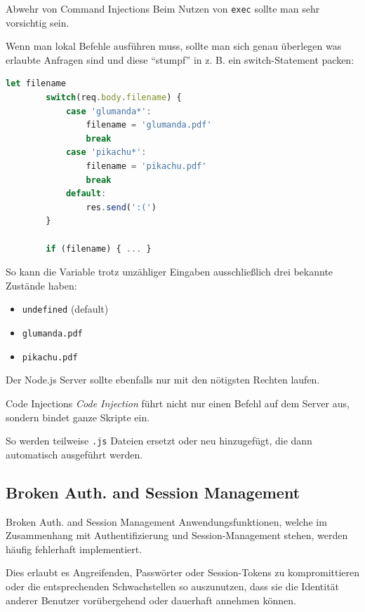 \begin{bonus}{Abwehr von Command Injections}
    Beim Nutzen von \texttt{exec} sollte man sehr vorsichtig sein.

    Wenn man lokal Befehle ausführen muss, sollte man sich genau überlegen was erlaubte Anfragen sind und diese \enquote{stumpf} in z. B. ein switch-Statement packen:
    \begin{lstlisting}[language=JavaScript]
        let filename
        switch(req.body.filename) {
            case 'glumanda*':
                filename = 'glumanda.pdf'
                break
            case 'pikachu*':
                filename = 'pikachu.pdf'
                break
            default:
                res.send(':(')
        }

        if (filename) { ... }
    \end{lstlisting}

    So kann die Variable trotz unzähliger Eingaben ausschließlich drei bekannte Zustände haben:
    \begin{itemize}
        \item \texttt{undefined} (default)
        \item \texttt{glumanda.pdf}
        \item \texttt{pikachu.pdf}
    \end{itemize}

    Der Node.js Server sollte ebenfalls nur mit den nötigsten Rechten laufen.
\end{bonus}

\begin{defi}{Code Injections}
    \emph{Code Injection} führt nicht nur einen Befehl auf dem Server aus, sondern bindet ganze Skripte ein.

    So werden teilweise \texttt{.js} Dateien ersetzt oder neu hinzugefügt, die dann automatisch ausgeführt werden.
\end{defi}

\subsection{Broken Auth. and Session Management}

\begin{defi}{Broken Auth. and Session Management}
    Anwendungsfunktionen, welche im Zusammenhang mit Authentifizierung und Session-Management stehen, werden häufig fehlerhaft implementiert.

    Dies erlaubt es Angreifenden, Passwörter oder Session-Tokens zu kompromittieren oder die entsprechenden Schwachstellen so auszunutzen, dass sie die Identität anderer Benutzer vorübergehend oder dauerhaft annehmen können.
\end{defi}

